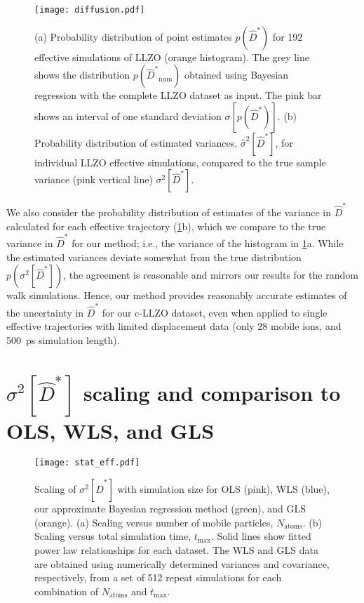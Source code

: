 \documentclass[reprint,superscriptaddress,nobibnotes,amsmath,amssymb,aps,prx,hidelinks]{revtex4-2}
\newcommand{\prob}[1]{\ensuremath{p(#1)}}
\newcommand{\Dest}{\ensuremath{\widehat{D}^*}}
\newcommand{\var}[1]{\ensuremath{\sigma^2[#1]}}
\newcommand{\varest}[1]{\ensuremath{\widehat{\sigma}^2[#1]}}
\begin{document}
\begin{figure}[tb]
    \centering
    \texttt{[image: diffusion.pdf]}
    \caption{
      (a) Probability distribution of point estimates $\prob{\Dest}$ for \num{192} effective simulations of LLZO (orange histogram).
      The grey line shows the distribution $\prob{\Dest_\mathrm{num}}$ obtained using Bayesian regression with the complete LLZO dataset as input.
      The pink bar shows an interval of one standard deviation $\sigma[\prob{\Dest}]$.
      (b) Probability distribution of estimated variances, $\varest{\Dest}$, for individual LLZO effective simulations, compared to the true sample variance (pink vertical line) $\var{\Dest}$.
    }
    \label{fig:diffusion}
\end{figure}

We also consider the probability distribution of estimates of the variance in $\Dest$ calculated for each effective trajectory (\cref{fig:diffusion}b), which we compare to the true variance in $\Dest$ for our method; i.e., the variance of the histogram in \cref{fig:diffusion}a.
While the estimated variances deviate somewhat from the true distribution $\prob{\var{\Dest}}$, the agreement is reasonable and mirrors our results for the random walk simulations.
Hence, our method provides reasonably accurate estimates of the uncertainty in $\Dest$ for our c-LLZO dataset, even when applied to single effective trajectories with limited displacement data (only 28 mobile ions, and \SI{500}{ps} simulation length).

\section{$\var{\Dest}$ scaling and comparison to OLS, WLS, and GLS}

\begin{figure}[htb]
    \centering
    \texttt{[image: stat\_eff.pdf]}
    \caption{
      Scaling of $\var{\Dest}$ with simulation size for OLS (pink), WLS (blue), our approximate Bayesian regression method (green), and GLS (orange).
      (a) Scaling versus number of mobile particles, $N_\mathrm{atoms}$.
      (b) Scaling versus total simulation time, $t_\mathrm{max}$.
      Solid lines show fitted power law relationships for each dataset.
      The WLS and GLS data are obtained using numerically determined variances and covariance, respectively, from a set of \num{512} repeat simulations for each combination of $N_\mathrm{atoms}$ and $t_\mathrm{max}$.
    }
    \label{fig:stat_eff}
\end{figure}
\end{document}
